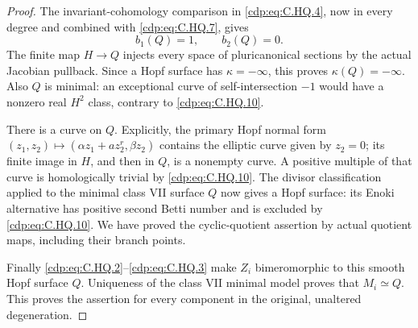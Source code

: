 \begin{proof}
The invariant-cohomology comparison in
\eqref{cdp:eq:C.HQ.4}, now in every degree and combined
with \eqref{cdp:eq:C.HQ.7}, gives
\[
                         b_1(Q)=1,
                         \qquad b_2(Q)=0.
 \tag{C.HQ.10}\label{cdp:eq:C.HQ.10}
\]
The finite map $H\to Q$ injects every space
of pluricanonical sections by the actual
Jacobian pullback. Since a Hopf surface
has $\kappa=-\infty$, this proves
$\kappa(Q)=-\infty$. Also $Q$ is minimal:
an exceptional curve of self-intersection
$-1$ would have a nonzero real $H^2$ class,
contrary to \eqref{cdp:eq:C.HQ.10}.

There is a curve on $Q$. Explicitly, the
primary Hopf normal form
$(z_1,z_2)\mapsto(\alpha z_1+a z_2^r,\beta z_2)$
contains the elliptic curve given by $z_2=0$;
its finite image in $H$, and then in $Q$,
is a nonempty curve. A positive multiple
of that curve is homologically trivial by
\eqref{cdp:eq:C.HQ.10}. The divisor classification
\cite[Remark~2.7]{DlousskyTeleman2012} applied
to the minimal class VII surface $Q$ now
gives a Hopf surface: its Enoki alternative
has positive second Betti number and is
excluded by \eqref{cdp:eq:C.HQ.10}. We have proved the
cyclic-quotient assertion by actual quotient
maps, including their branch points.

Finally \eqref{cdp:eq:C.HQ.2}--\eqref{cdp:eq:C.HQ.3} make $Z_i$
bimeromorphic to this smooth Hopf surface
$Q$. Uniqueness of the class VII minimal
model proves that $M_i\simeq Q$. This
proves the assertion for every component
in the original, unaltered degeneration.
\end{proof}


